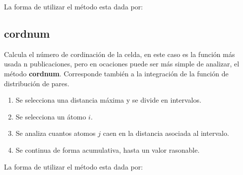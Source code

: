La forma de utilizar el m\'etodo esta dada por:


\subsection{cordnum}
Calcula el n\'umero de cordinaci\'on de la celda, en este caso es la funci\'on m\'as usada n publicaciones, pero en ocaciones puede ser m\'as simple de analizar, el m\'etodo \textbf{cordnum}. Corresponde tambi\'en a la integraci\'on de la funci\'on de distribuci\'on de pares.
\begin{enumerate}
 \item Se selecciona una distancia m\'axima y se divide en intervalos.
 \item Se selecciona un \'atomo $i$.
 \item Se analiza cuantos atomos $j$ caen en la distancia asociada al intervalo.
 \item Se continua de forma acumulativa, hasta un valor rasonable.
\end{enumerate}

La forma de utilizar el m\'etodo esta dada por:



